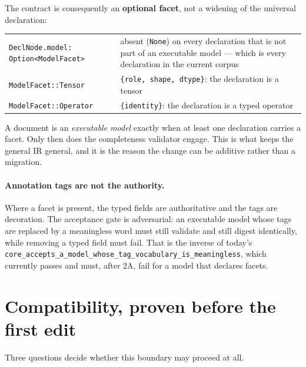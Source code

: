 \documentclass[11pt,a4paper]{article}
\begin{document}
The contract is consequently an \textbf{optional facet}, not a widening of the universal
declaration:

\begin{center}\small
\begin{tabular}{@{}lp{95mm}@{}}
\toprule
\texttt{DeclNode.model: Option<ModelFacet>} & absent (\texttt{None}) on every declaration that is
not part of an executable model --- which is every declaration in the current corpus \\
\texttt{ModelFacet::Tensor} & \texttt{\{role, shape, dtype\}}: the declaration is a tensor \\
\texttt{ModelFacet::Operator} & \texttt{\{identity\}}: the declaration is a typed operator \\
\bottomrule
\end{tabular}
\end{center}

A document is an \emph{executable model} exactly when at least one declaration carries a facet.
Only then does the completeness validator engage. This is what keeps the general IR general, and it
is the reason the change can be additive rather than a migration.

\paragraph{Annotation tags are not the authority.} Where a facet is present, the typed fields are
authoritative and the tags are decoration. The acceptance gate is adversarial: an executable model
whose tags are replaced by a meaningless word must still validate and still digest identically,
while removing a typed field must fail. That is the inverse of today's
\texttt{core\_accepts\_a\_model\_whose\_tag\_vocabulary\_is\_meaningless}, which currently passes and
must, after 2A, fail for a model that declares facets.

\section{Compatibility, proven before the first edit}

Three questions decide whether this boundary may proceed at all.
\end{document}
